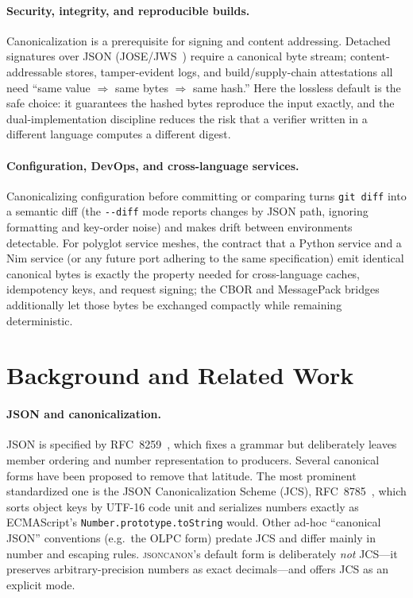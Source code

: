 \documentclass[11pt]{article}
\newcommand{\tool}{\textsc{jsoncanon}}
\newcommand{\code}[1]{\texttt{#1}}
\begin{document}
\paragraph{Security, integrity, and reproducible builds.}
Canonicalization is a prerequisite for signing and content addressing. Detached
signatures over JSON (JOSE/JWS~\cite{rfc7515}) require a canonical byte stream;
content-addressable stores, tamper-evident logs, and build/supply-chain
attestations all need ``same value $\Rightarrow$ same bytes $\Rightarrow$ same
hash.'' Here the lossless default is the safe choice: it guarantees the hashed
bytes reproduce the input exactly, and the dual-implementation discipline reduces
the risk that a verifier written in a different language computes a different
digest.

\paragraph{Configuration, DevOps, and cross-language services.}
Canonicalizing configuration before committing or comparing turns \code{git diff}
into a semantic diff (the \code{-{}-diff} mode reports changes by JSON path,
ignoring formatting and key-order noise) and makes drift between environments
detectable. For polyglot service meshes, the contract that a Python service and a
Nim service (or any future port adhering to the same specification) emit identical
canonical bytes is exactly the property needed for cross-language caches,
idempotency keys, and request signing; the CBOR and MessagePack bridges
additionally let those bytes be exchanged compactly while remaining deterministic.

\section{Background and Related Work}\label{sec:background}

\paragraph{JSON and canonicalization.}
JSON is specified by RFC~8259~\cite{rfc8259}, which fixes a grammar but
deliberately leaves member ordering and number representation to producers.
Several canonical forms have been proposed to remove that latitude. The most
prominent standardized one is the JSON Canonicalization Scheme (JCS),
RFC~8785~\cite{rfc8785}, which sorts object keys by UTF-16 code unit and
serializes numbers exactly as ECMAScript's \code{Number.prototype.toString}
would. Other ad-hoc ``canonical JSON'' conventions (e.g.\ the OLPC form) predate
JCS and differ mainly in number and escaping rules. \tool{}'s default form is
deliberately \emph{not} JCS---it preserves arbitrary-precision numbers as exact
decimals---and offers JCS as an explicit mode.
\end{document}
